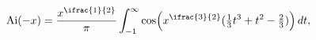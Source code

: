 \[\mathop{\mathrm{Ai}\/}\nolimits\!\left(-x\right)=\frac{x^{\ifrac{1}{2}}}{\pi}%
\int_{-1}^{\infty}\mathop{\cos\/}\nolimits\!\left(x^{\ifrac{3}{2}}(\tfrac{1}{3%
}t^{3}+t^{2}-\tfrac{2}{3})\right)dt,\]